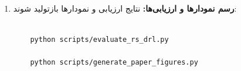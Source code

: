 \documentclass[oneside,openany,a4paper,12pt]{article}
\begin{document}
\begin{enumerate}
\begin{singlespace}
    \begin{latin}

    \begin{verbatim}

    python scripts/collect_offline_data.py

    python scripts/train_rs_drl.py --rho 0.3 --seeds 42 43 44

    \end{verbatim}

    \end{latin}

    \end{singlespace}

    

    \item \textbf{رسم نمودارها و ارزیابی‌ها:} نتایج ارزیابی و نمودارها بازتولید شوند:

    \begin{singlespace}

    \begin{latin}

    \begin{verbatim}

    python scripts/evaluate_rs_drl.py

    python scripts/generate_paper_figures.py

    \end{verbatim}

    \end{latin}

    \end{singlespace}

\end{enumerate}
\end{document}

